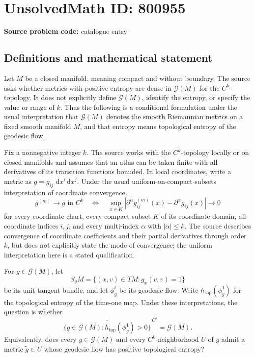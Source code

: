 \documentclass[11pt]{article}
\newcommand{\dd}{\,\mathrm{d}}
\begin{document}
\section*{UnsolvedMath ID: 800955}
\textbf{Source problem code:} catalogue entry
\subsection{Definitions and mathematical statement}
Let \(M\) be a closed manifold, meaning compact and without boundary. The source asks whether metrics with positive entropy are dense in \(\mathcal G(M)\) for the \(C^k\)-topology. It does not explicitly define \(\mathcal G(M)\), identify the entropy, or specify the value or range of \(k\). Thus the following is a conditional formulation under the usual interpretation that \(\mathcal G(M)\) denotes the smooth Riemannian metrics on a fixed smooth manifold \(M\), and that entropy means topological entropy of the geodesic flow.

Fix a nonnegative integer \(k\). The source works with the \(C^k\)-topology locally or on closed manifolds and assumes that an atlas can be taken finite with all derivatives of its transition functions bounded. In local coordinates, write a metric as \(g=g_{ij}\,\dd x^i\dd x^j\). Under the usual uniform-on-compact-subsets interpretation of coordinate convergence,
\[
 g^{(m)}\longrightarrow g\text{ in }C^k
 \quad\Longleftrightarrow\quad
 \sup_{x\in K}\left|\partial^\alpha g^{(m)}_{ij}(x)-\partial^\alpha g_{ij}(x)\right|\longrightarrow0
\]
for every coordinate chart, every compact subset \(K\) of its coordinate domain, all coordinate indices \(i,j\), and every multi-index \(\alpha\) with \(|\alpha|\le k\). The source describes convergence of coordinate coefficients and their partial derivatives through order \(k\), but does not explicitly state the mode of convergence; the uniform interpretation here is a stated qualification.

For \(g\in\mathcal G(M)\), let
\[
 S_gM=\{(x,v)\in TM:g_x(v,v)=1\}
\]
be its unit tangent bundle, and let \(\phi_g^t\) be its geodesic flow. Write \(h_{\mathrm{top}}(\phi_g^1)\) for the topological entropy of the time-one map. Under these interpretations, the question is whether
\[
 \overline{\{g\in\mathcal G(M):h_{\mathrm{top}}(\phi_g^1)>0\}}^{\,C^k}
 =\mathcal G(M).
\]
Equivalently, does every \(g\in\mathcal G(M)\) and every \(C^k\)-neighborhood \(U\) of \(g\) admit a metric \(\widetilde g\in U\) whose geodesic flow has positive topological entropy?
\end{document}
